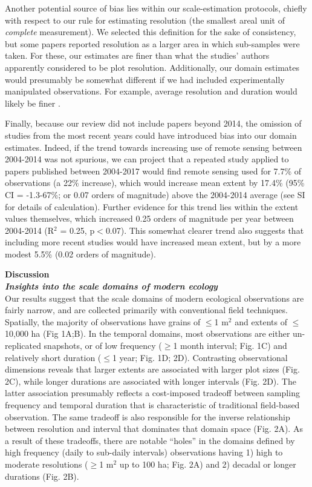 \documentclass[12pt]{article}
\begin{document}
Another potential source of bias lies within our scale-estimation protocols, chiefly with respect to our rule for estimating resolution (the smallest areal unit of \emph{complete} measurement). We selected this definition for the sake of consistency, but some papers reported resolution as a larger area in which sub-samples were taken. For these, our estimates are finer than what the studies' authors apparently considered to be plot resolution. Additionally, our domain estimates would presumably be somewhat different if we had included experimentally manipulated observations. For example, average resolution and duration would likely be finer \cite{tilman_ecological_1989,kareiva_spatial_1988}.  

Finally, because our review did not include papers beyond 2014, the omission of studies from the most recent years could have introduced bias into our domain estimates. Indeed, if the trend towards increasing use of remote sensing between 2004-2014 was not spurious, we can project that a repeated study applied to papers published between 2004-2017 would find remote sensing used for 7.7\% of observations (a 22\% increase), which would increase mean extent by 17.4\% (95\% CI = -1.3-67\%;  or 0.07 orders of magnitude) above the 2004-2014 average (see SI for details of calculation). Further evidence for this trend lies within the extent values themselves, which increased 0.25 orders of magnitude per year between 2004-2014 (R$^2$ = 0.25, p$<$0.07). This somewhat clearer trend also suggests that including more recent studies would have increased mean extent, but by a more modest 5.5\% (0.02 orders of magnitude).  

\noindent \textbf{Discussion}\\
\noindent \textbf{\emph{Insights into the scale domains of modern ecology}}\\
Our results suggest that the scale domains of modern ecological observations are fairly narrow, and are collected primarily with conventional field techniques. Spatially, the majority of observations have grains of $\leq$1 m$^2$ and extents of $\leq$10,000 ha (Fig 1A;B). In the temporal domains, most observations are either un-replicated snapshots, or of low frequency ($\geq$1 month interval; Fig. 1C) and relatively short duration ($\leq$1 year; Fig. 1D; 2D). Contrasting observational dimensions reveals that larger extents are associated with larger plot sizes (Fig. 2C), while longer durations are associated with longer intervals (Fig. 2D). The latter association presumably reflects a cost-imposed tradeoff between sampling frequency and temporal duration that is characteristic of traditional field-based observation. The same tradeoff is also responsible for the inverse relationship between resolution and interval that dominates that domain space (Fig. 2A). As a result of these tradeoffs, there are notable ``holes'' in the domains defined by high frequency (daily to sub-daily intervals) observations having 1) high to moderate resolutions ($\geq$1 m$^2$ up to 100 ha; Fig. 2A) and 2) decadal or longer durations (Fig. 2B).  
\end{document}
